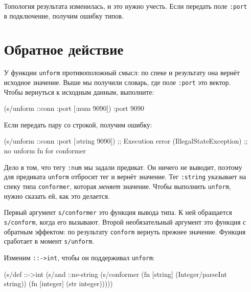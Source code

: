 Топология результата изменилась, и это нужно учесть. Если передать поле
\verb|:port| в подключение, получим ошибку типов.

\section{Обратное действие}


У функции \verb|unform| противоположный смысл: по спеке и результату она
вернёт исходное значение. Выше мы получили словарь, где поле \verb|:port| это
вектор. Чтобы вернуться к исходным данным, выполните:

\begin{english}
  \begin{clojure}
(s/unform ::conn {:port [:num 9090]})
{:port 9090}
  \end{clojure}
\end{english}

\noindent
Если передать пару со строкой, получим ошибку:

\begin{english}
  \begin{clojure}
(s/unform ::conn {:port [:string 9090]})
;; Execution error (IllegalStateException)
;; no unform fn for conformer
  \end{clojure}
\end{english}

Дело в том, что тегу \verb|:num| мы задали предикат. Он ничего не выводит,
поэтому для предиката \verb|unform| отбросит тег и вернёт значение. Тег
\verb|:string| указывает на спеку типа \verb|conformer|, которая
\emph{меняет} значение. Чтобы выполнить \verb|unform|, нужно сказать ей, как
это делается.


Первый аргумент \verb|s/conformer| это функция вывода типа. К ней обращается
\verb|s/conform|, когда его вызывают. Второй необязательный аргумент это
функция с обратным эффектом: по результату \verb|conform| вернуть прежнее
значение. Функция сработает в момент \verb|s/unform|.

Изменим \verb|::->int|, чтобы он поддерживал \verb|unform|:

\begin{english}
  \begin{clojure}
(s/def ::->int
  (s/and
   ::ne-string
   (s/conformer
    (fn [string]
      (Integer/parseInt string))
    (fn [integer]
      (str integer)))))
  \end{clojure}
\end{english}

